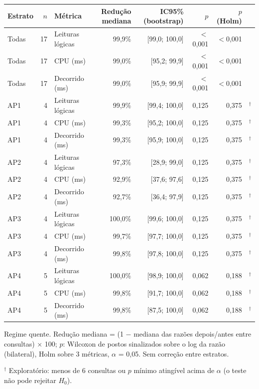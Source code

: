 {\small\setlength{\tabcolsep}{4pt}
\begin{tabular}{lrlrrrrl}
\toprule
Estrato & $n$ & Métrica & Redução mediana & IC95\% (bootstrap) & $p$ & $p$ (Holm) &  \\
\midrule
Todas & 17 & Leituras lógicas & 99,9\% & [99,0; 100,0] & $<$0,001 & $<$0,001 &  \\
Todas & 17 & CPU (ms) & 99,0\% & [95,2; 99,9] & $<$0,001 & $<$0,001 &  \\
Todas & 17 & Decorrido (ms) & 99,0\% & [95,9; 99,9] & $<$0,001 & $<$0,001 &  \\
\midrule
AP1 & 4 & Leituras lógicas & 99,9\% & [99,4; 100,0] & 0,125 & 0,375 & $^{\dagger}$ \\
AP1 & 4 & CPU (ms) & 99,3\% & [95,2; 100,0] & 0,125 & 0,375 & $^{\dagger}$ \\
AP1 & 4 & Decorrido (ms) & 99,3\% & [95,9; 100,0] & 0,125 & 0,375 & $^{\dagger}$ \\
\midrule
AP2 & 4 & Leituras lógicas & 97,3\% & [28,9; 99,0] & 0,125 & 0,375 & $^{\dagger}$ \\
AP2 & 4 & CPU (ms) & 92,9\% & [37,6; 97,6] & 0,125 & 0,375 & $^{\dagger}$ \\
AP2 & 4 & Decorrido (ms) & 92,7\% & [36,4; 97,9] & 0,125 & 0,375 & $^{\dagger}$ \\
\midrule
AP3 & 4 & Leituras lógicas & 100,0\% & [99,6; 100,0] & 0,125 & 0,375 & $^{\dagger}$ \\
AP3 & 4 & CPU (ms) & 99,7\% & [97,7; 100,0] & 0,125 & 0,375 & $^{\dagger}$ \\
AP3 & 4 & Decorrido (ms) & 99,8\% & [97,8; 100,0] & 0,125 & 0,375 & $^{\dagger}$ \\
\midrule
AP4 & 5 & Leituras lógicas & 100,0\% & [98,9; 100,0] & 0,062 & 0,188 & $^{\dagger}$ \\
AP4 & 5 & CPU (ms) & 99,8\% & [91,7; 100,0] & 0,062 & 0,188 & $^{\dagger}$ \\
AP4 & 5 & Decorrido (ms) & 99,8\% & [87,5; 100,0] & 0,062 & 0,188 & $^{\dagger}$ \\
\bottomrule
\end{tabular}\par
\vspace{3pt}
\begin{minipage}{\linewidth}\footnotesize
Regime quente. Redução mediana = (1 $-$ mediana das razões depois/antes entre consultas) $\times$ 100; $p$: Wilcoxon de postos sinalizados sobre o log da razão (bilateral), Holm sobre 3 métricas, $\alpha$ = 0,05. Sem correção entre estratos.\par
$^{\dagger}$ Exploratório: menos de 6 consultas ou $p$ mínimo atingível acima de $\alpha$ (o teste não pode rejeitar $H_0$).
\end{minipage}
}
